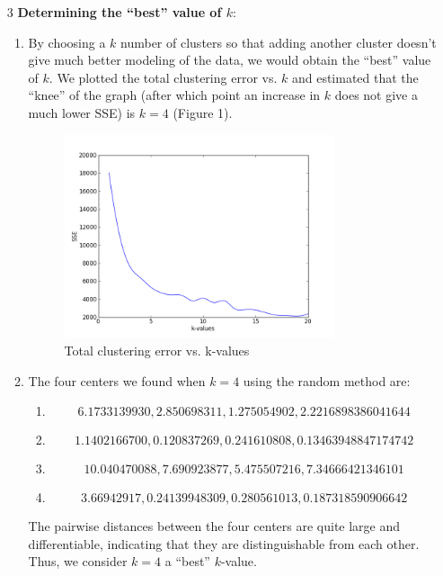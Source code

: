 \documentclass[12pt]{article}
\begin{document}
\begin{enumerate}
    \item[3] \textbf{Determining the ``best'' value of $k$}: 
      \begin{enumerate}
      \item By choosing a $k$ number of clusters so that adding another cluster doesn't give much better modeling of the data, we would obtain the “best” value of $k$. We plotted the total clustering error vs. $k$ and estimated that the ``knee'' of the graph (after which point an increase in $k$ does not give a much lower SSE) is $k=4$ (Figure 1). 
        \begin{figure}[h]
          \centering
          \includegraphics[width=0.80\textwidth]{SSEvsK-values.png}
          \caption{Total clustering error vs. k-values}
        \end{figure}
      \item The four centers we found when $k=4$ using the random method are:
        \begin{enumerate}
          \item \[6.1733139930, 2.850698311, 1.275054902, 2.2216898386041644\]
	  \item \[1.1402166700, 0.120837269, 0.241610808, 0.13463948847174742\]
	  \item \[10.040470088, 7.690923877, 5.475507216, 7.34666421346101\]
	  \item \[3.66942917, 0.24139948309, 0.280561013, 0.187318590906642\]
            \end{enumerate}
    The pairwise distances between the four centers are quite large and differentiable, indicating that they are distinguishable from each other. Thus, we consider $k=4$ a “best” $k$-value.
      \end{enumerate}


\end{enumerate}
\end{document}
